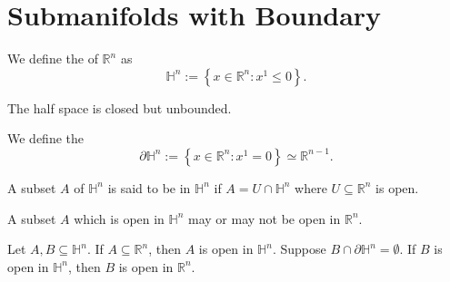 \documentclass[notoc,notitlepage]{tufte-book}
\begin{document}

\section{Submanifolds with Boundary}%
\label{sec:submanifolds_with_boundary}

\begin{defn}\label{defn:half_space}
  We define the  of $\mathbb{R}^n$ as
  \begin{equation*}
    \mathbb{H}^n := \left\{ x \in \mathbb{R}^n : x^1 \leq 0 \right\}.
  \end{equation*}
\end{defn}

\begin{note}
  The half space is closed but unbounded.
\end{note}

\begin{defn}\label{defn:boundary_of_the_half_space}
  We define the 
  \begin{equation*}
    \partial \mathbb{H}^n := \left\{ x \in \mathbb{R}^n : x^1 = 0 \right\}
    \simeq \mathbb{R}^{n - 1}.
  \end{equation*}
\end{defn}

\begin{defn}\label{defn:open_subset_in_a_half_space}
  A subset $A$ of $\mathbb{H}^n$ is said to be  in $\mathbb{H}^n$ if $A = U
  \cap \mathbb{H}^n$ where $U \subseteq \mathbb{R}^n$ is open.
\end{defn}

\begin{note}
  A subset $A$ which is open in $\mathbb{H}^n$ may or may not be open in
  $\mathbb{R}^n$.
\end{note}

\begin{lemma}\label{lemma:characterization_of_open_sets_in_a_half_space}
  Let $A, B \subseteq \mathbb{H}^n$. If $A \subseteq \mathbb{R}^n$, then $A$ is
  open in $\mathbb{H}^n$. Suppose $B \cap \partial \mathbb{H}^n = \emptyset$. If
  $B$ is open in $\mathbb{H}^n$, then $B$ is open in $\mathbb{R}^n$.
\end{lemma}
\end{document}
